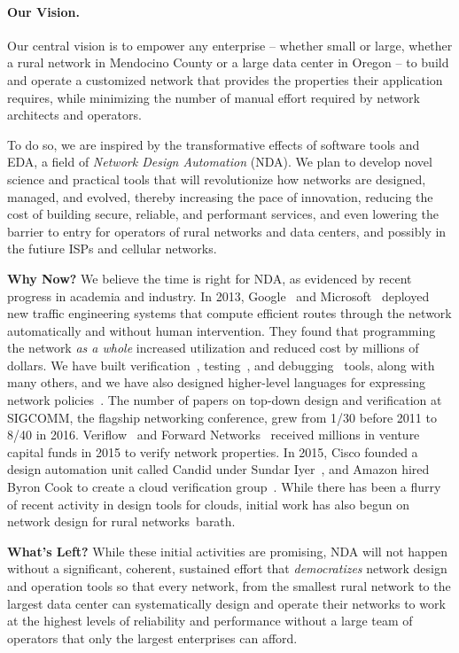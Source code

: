 \paragraph*{Our Vision.}
%
Our central vision is to empower any enterprise – whether small or large, whether
a rural network in Mendocino County or a large data center in  Oregon -- to build and operate a customized network that provides the properties their application requires, while minimizing the number of manual effort required by network architects and  operators.

To do so, we are inspired by the transformative effects of software tools and EDA, a field of {\em Network Design Automation} (NDA). We plan to develop novel science and practical tools that will  revolutionize how networks are designed, managed, and evolved, thereby increasing the pace of innovation, reducing the cost of building secure, reliable, and performant services, and even lowering the barrier to entry for operators of rural networks and data centers, and possibly in the futiure
ISPs and cellular networks.

{\bf Why Now?} We believe the time is right for NDA, as evidenced by recent progress in academia and industry. In 2013, Google~\cite{b4} and Microsoft~\cite{swan} deployed new traffic engineering systems that compute efficient routes through the network automatically and without human intervention. They found that programming the network {\em as a whole} increased utilization and reduced cost by millions of dollars. We have built verification~\cite{veriflow,hsa,lam}, testing~\cite{atpg,nice}, and debugging~\cite{xtrace} tools, along with many others, and we have also designed higher-level languages for expressing network policies~\cite{netcore-popl12,netkat}. The number of papers on top-down design and verification at SIGCOMM, the flagship networking conference, grew from 1/30 before 2011 to 8/40 in 2016. Veriflow~\cite{veriflow} and Forward Networks~\cite{forward} received millions in venture capital funds in 2015 to verify network properties. In 2015, Cisco founded a design automation unit called Candid under Sundar Iyer~\cite{sundar}, and Amazon hired Byron Cook to create a cloud verification group~\cite{byron}.  While there has been a flurry of recent activity in 
design tools for clouds, initial work has also begun on network design for rural
networks~{barath}.

{\bf What's Left?} While these initial activities are promising, NDA will not happen without a significant, coherent, sustained effort that {\em democratizes} network design
and operation tools so that every network, from the smallest rural network to the
largest data center can systematically design and operate their networks to work at the highest levels of reliability and performance without a large team of operators that only the largest enterprises can afford.

